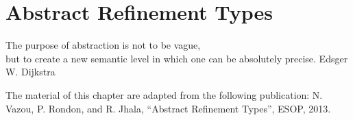 \chapter{Abstract Refinement Types}\label{chapter:abstractrefinements}
\makequote
{The purpose of abstraction is not to be vague,\\
but to create a new semantic level in which one can be absolutely precise.}
{Edsger W. Dijkstra}


\renewcommand{\reft}{\ensuremath{e}\xspace}
\renewcommand\tref[2]{\ensuremath{\left\lbrace \vref : #1\mid #2\right\rbrace}}
\renewcommand\tref[2]{\ensuremath{\left\lbrace \vref : #1\mid #2\right\rbrace}}

\renewcommand\subt{\preceq}
\renewcommand\corelan{$\lambda_\downarrow$\xspace}
\renewcommand\sub[2]{\ensuremath{ \left[ #1 \mapsto #2 \right] }}
\renewcommand\shape{\ensuremath{\text{shape}}\xspace}
\renewcommand\tfun[3]{\ensuremath{{(#1:#2)} \rightarrow #3}}


\renewcommand\ecase[5]{\ensuremath{
	\mathtt{case}\ #5 = #1\ \mathtt{of}\ \{ #2\ #3 \rightarrow #4\}
}}

\renewcommand\corelan{$\lambda_{P}$\xspace}








The material of this chapter are adapted from the following publication:
\noindent N. Vazou, P. Rondon, and R. Jhala,
``Abstract Refinement Types'', 
ESOP, 2013.
